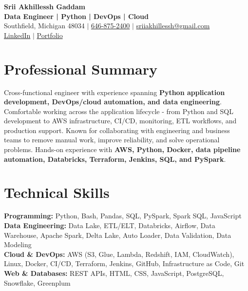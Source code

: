 \documentclass[letterpaper,10pt]{article}
\begin{document}
\fontsize{9.35pt}{10.45pt}\selectfont

\begin{center}
    {\LARGE \textbf{Srii Akhillessh Gaddam}} \\[-1pt]
    \textbf{Data Engineer | Python | DevOps | Cloud} \\[2pt]
    Southfield, Michigan 48034 $|$
    \href{tel:6468752400}{646-875-2400} $|$
    \href{mailto:sriiakhillessh@gmail.com}{sriiakhillessh@gmail.com} \\[1pt]
    \href{https://www.linkedin.com/in/srii-akhiilessh-gaddam-b48668191/}{LinkedIn} $|$
    \href{https://sriiakhillesshg.github.io/portfolio/}{Portfolio}
\end{center}
\vspace{-8pt}

\section{Professional Summary}
\small{Cross-functional engineer with experience spanning \textbf{Python application development, DevOps/cloud automation, and data engineering}. Comfortable working across the application lifecycle - from Python and SQL development to AWS infrastructure, CI/CD, monitoring, ETL workflows, and production support. Known for collaborating with engineering and business teams to remove manual work, improve reliability, and solve operational problems. Hands-on experience with \textbf{AWS, Python, Docker, data pipeline automation, Databricks, Terraform, Jenkins, SQL, and PySpark}.}

\section{Technical Skills}
\small{
\textbf{Programming:} Python, Bash, Pandas, SQL, PySpark, Spark SQL, JavaScript \\
\textbf{Data Engineering:} Data Lake, ETL/ELT, Databricks, Airflow, Data Warehouse, Apache Spark, Delta Lake, Auto Loader, Data Validation, Data Modeling \\
\textbf{Cloud \& DevOps:} AWS (S3, Glue, Lambda, Redshift, IAM, CloudWatch), Linux, Docker, CI/CD, Terraform, Jenkins, GitHub, Infrastructure as Code, Git \\
\textbf{Web \& Databases:} REST APIs, HTML, CSS, JavaScript, PostgreSQL, Snowflake, Greenplum
}
\end{document}
